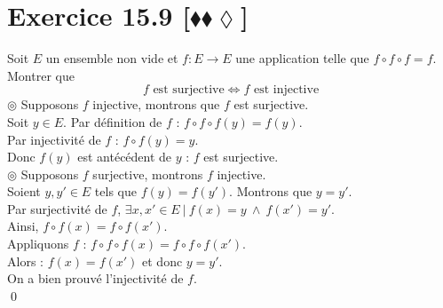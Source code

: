 \documentclass[10pt]{article}
\begin{document}
\section*{Exercice 15.9 [$\blacklozenge\blacklozenge\lozenge$]}
\begin{tcolorbox}[enhanced, width=7.6in, center, size=fbox, fontupper=\large, drop shadow southwest]
    Soit $E$ un ensemble non vide et $f:E\to E$ une application telle que $f \circ f \circ f = f$.\\
    Montrer que
    \begin{equation*}
        f \text{ est surjective} \iff f \text{ est injective}
    \end{equation*}
    $\circledcirc$ Supposons $f$ injective, montrons que $f$ est surjective.\\
    Soit $y \in E$. Par définition de $f$ : $f \circ f \circ f(y) = f(y)$.\\
    Par injectivité de $f$ : $f\circ f(y) = y$.\\
    Donc $f(y)$ est antécédent de $y$ : $f$ est surjective.\\[0.1cm]
    $\circledcirc$ Supposons $f$ surjective, montrons $f$ injective.\\
    Soient $y, y' \in E$ tels que $f(y) = f(y')$. Montrons que $y=y'$.\\
    Par surjectivité de $f$, $\exists x,x' \in E ~ | ~ f(x) = y ~ \wedge ~ f(x') = y'$.\\
    Ainsi, $f\circ f(x) = f \circ f (x')$.\\
    Appliquons $f$ : $f \circ f \circ f(x) = f \circ f \circ f(x')$.\\
    Alors : $f(x) = f(x')$ et donc $y = y'$.\\
    On a bien prouvé l'injectivité de $f$.\\
    \qed
\end{tcolorbox}
\end{document}
